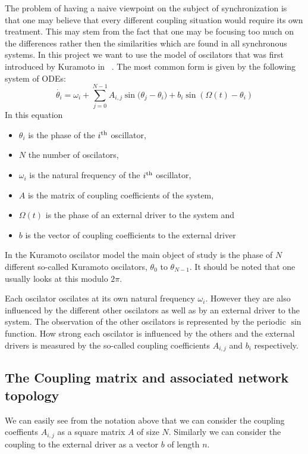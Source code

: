 \label{sec:kuramoto}

The problem of having a naive viewpoint on the subject of synchronization is that one may believe that every different coupling situation would require its own treatment. This may stem from the fact that one may be focusing too much on the differences rather then the similarities which are found in all synchronous systems.  In this project we want to use the model of oscilators that was first introduced by Kuramoto in ~\cite{book:kura}. The most common form is given by the following system of ODEs:
\[
\dot{\theta_i} = \omega_i + \sum_{j = 0}^{N - 1}{A_{i, j}\sin({\theta_j - \theta_i}}) + b_i \sin(\Omega(t) - \theta_i)
\]
In this equation
\begin{itemize}
	\item $\theta_i$ is the phase of the $i\textsuperscript{th}$ oscillator, 
	\item $N$ the number of oscilators, 
	\item $\omega_i$ is the natural frequency of the $i\textsuperscript{th}$ oscillator, 
	\item $A$ is the matrix of coupling coefficients of the system, 
	\item $\Omega(t)$ is the phase of an external driver to the system and
	\item $b$ is the vector of coupling coefficients to the external driver
\end{itemize}

In the Kuramoto oscilator model the main object of study is the phase of $N$ different so-called Kuramoto oscilators, $\theta_0$ to $\theta_{N - 1}$. It should be noted that one usually looks at this modulo $2 \pi$. 

Each oscilator oscilates at its own natural frequency $\omega_i$. However they are also influenced by the different other oscilators as well as by an external driver to the system. The observation of the other oscilators is represented by the periodic $\sin$ function. How strong each oscilator is influenced by the others and the external drivers is measured by the so-called coupling coefficients $A_{i, j}$ and $b_i$ respectively. 

\subsection{The Coupling matrix and associated network topology}

We can easily see from the notation above that we can consider the coupling coeffients $A_{i, j}$ as a square matrix $A$ of size $N$. Similarly we can consider the coupling to the external driver as a vector $b$ of length $n$. 


